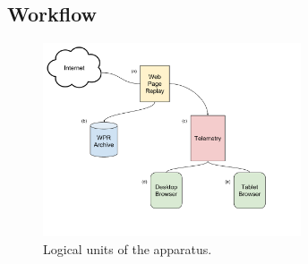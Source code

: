 \subsection{Workflow} \label{workflow}
\begin{figure}[t]
    \hspace{-10pt}
    \includegraphics[width=3in]{../images/methodology_workflow_diagram.pdf}
    \caption[]{\label{fig:workflow_diagram}Logical units of the apparatus.}
\end{figure}
